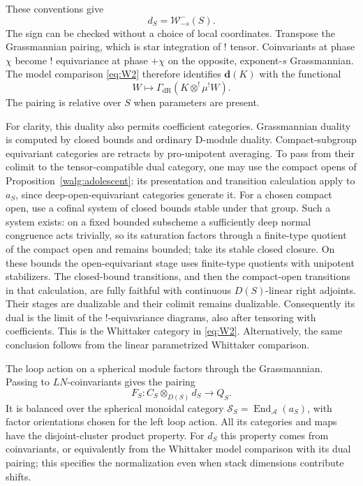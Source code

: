 \documentclass[11pt]{article}
\numberwithin{equation}{section}
\theoremstyle{definition}
\theoremstyle{remark}
\begin{document}
These conventions give
\begin{equation}\label{loop:whittaker-coinvariants}
                     d_S=\mathcal W_{-s}^-(S).
\end{equation}
The sign can be
checked without a choice of local coordinates.  Transpose the
Grassmannian pairing, which is star integration of ! tensor.
Coinvariants at phase $\chi$ become ! equivariance at phase $+\chi$
on the opposite, exponent-$s$ Grassmannian.  The model comparison
\eqref{eq:W2} therefore identifies $\mathbf d(K)$ with the functional
\begin{equation}\label{eq:loop-whittaker-functional}
                 W\longmapsto
                  \Gamma_{\mathrm{dR}}(K\otimes^!\mu^!W).
\end{equation}
The pairing is relative over $S$ when parameters are present.

For clarity, this duality also permits coefficient categories.
Grassmannian duality is computed by closed bounds and ordinary
D-module duality.  Compact-subgroup equivariant categories are
retracts by pro-unipotent averaging.  To pass from their colimit to
the tensor-compatible dual category, one may use the compact opens
of Proposition~\ref{walg:adolescent}: its presentation and transition
calculation apply to $a_S$, since deep-open-equivariant categories
generate it.
For a chosen compact open, use a cofinal system of closed bounds
stable under that group.  Such a system exists: on a fixed bounded
subscheme a sufficiently deep normal congruence acts trivially,
so its saturation factors through a finite-type quotient of the
compact open and remains bounded; take its stable closed closure.
On these bounds the open-equivariant stage uses finite-type
quotients with unipotent stabilizers.  The closed-bound transitions,
and then the compact-open transitions in that calculation, are
fully faithful with continuous $D(S)$-linear right adjoints.
Their stages are dualizable and their colimit remains dualizable.
Consequently its dual is the limit of the !-equivariance diagrams,
also after tensoring with coefficients.  This is the Whittaker
category in \eqref{eq:W2}.  Alternatively, the same conclusion
follows from the linear parametrized Whittaker comparison.

The loop action on a spherical module factors through the
Grassmannian.  Passing to $LN$-coinvariants gives the pairing
\begin{equation}\label{eq:L3}
                     F_S:C_S\otimes_{D(S)}d_S\longrightarrow Q_S.
\end{equation}
It is balanced over the spherical monoidal category
$\mathcal S_S=\operatorname{End}_{\mathcal A}(a_S)$, with factor
orientations chosen for the left loop action.  All its categories
and maps have the disjoint-cluster product property.  For $d_S$
this property comes from coinvariants, or equivalently from the
Whittaker model comparison with its dual pairing; this specifies
the normalization even when stack dimensions contribute shifts.
\end{document}
